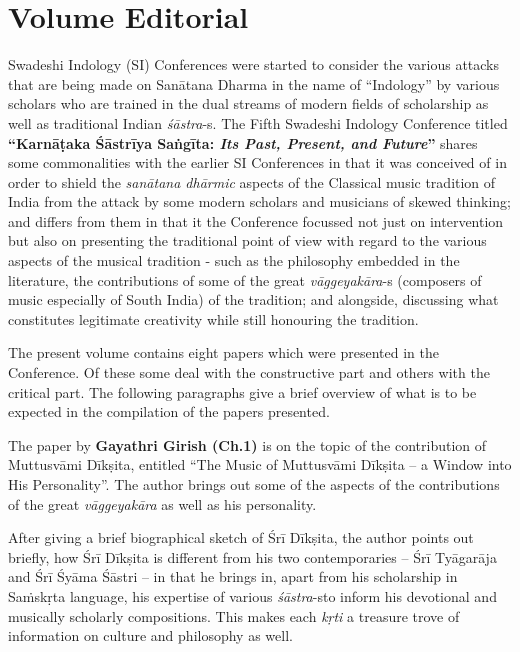 
\chapter*{Volume Editorial}\label{volumeeditorial}

Swadeshi Indology (SI) Conferences were started to consider the various attacks that are being made on Sanātana Dharma in the name of “Indology” by various scholars who are trained in the dual streams of modern fields of scholarship as well as traditional Indian \textit{śāstra}-s. The Fifth Swadeshi Indology Conference titled \textbf{“Karnāṭaka Śāstrīya Saṅgīta: \textit{Its Past, Present, and Future}”} shares some commonalities with the earlier SI Conferences in that it was conceived of in order to shield the \textit{sanātana dhārmic} aspects of the Classical music tradition of India from the attack by some modern scholars and musicians of skewed thinking; and differs from them in that it the Conference focussed not just on intervention but also on presenting the traditional point of view with regard to the various aspects of the musical tradition - such as the philosophy embedded in the literature, the contributions of some of the great \textit{vāggeyakāra}-s (composers of music especially of South India) of the tradition; and alongside, discussing what constitutes legitimate creativity while still honouring the tradition.

The present volume contains eight papers which were presented in the Conference. Of these some deal with the constructive part and others with the critical part. The following paragraphs give a brief overview of what is to be expected in the compilation of the papers presented.

\delimiter


\vspace{-.2cm}

The paper by \textbf{Gayathri Girish (Ch.1)} is on the topic of the contribution of Muttusvāmi Dīkṣita, entitled “The Music of Muttusvāmi Dīkṣita – a Window into His Personality”. The author brings out some of the aspects of the contributions of the great \textit{vāggeyakāra} as well as his personality.

After giving a brief biographical sketch of Śrī Dīkṣita, the author points out briefly, how Śrī Dīkṣita is different from his two contemporaries – Śrī Tyāgarāja and Śrī Śyāma Śāstri – in that he brings in, apart from his scholarship in Saṁskṛta language, his expertise of various \textit{śāstra}-s\break to inform his devotional and musically scholarly compositions. This makes each \textit{kṛti} a treasure trove of information on culture and philosophy as well. 

